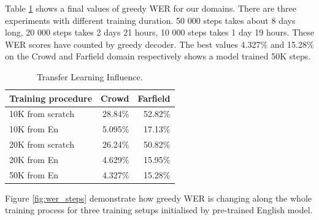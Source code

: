 \documentclass[a4paper]{article}
\begin{document}
Table \ref{tab:wer_50k} shows a final values of greedy WER for our domains. There are three experiments with different training duration. 50 000 steps takes about 8 days long, 20 000 steps takes 2 days 21 hours, 10 000 steps takes 1 day 19 hours. These WER scores have counted by greedy decoder. The best values 4.327\% and 15.28\% on the Crowd and Farfield domain respectively shows a model trained 50K steps. 

\begin{table}[t]
  \caption{Transfer Learning Influence.}
  \label{tab:wer_50k}
  \centering
  \begin{tabular}{lrr}
    \toprule
    \textbf{Training procedure } & \textbf{Crowd} & \textbf{Farfield} \\
    \midrule
    10K from scratch   &  28.84\%   & 52.82\% \\
    10K from En    & 5.095\%       & 17.13\%  \\
    \midrule
    20K from scratch   &  26.24\%   & 50.82\% \\
    20K from En    & 4.629\%       & 15.95\% \\
    \midrule
    50K from En    & 4.327\%       & 15.28\% \\
    \bottomrule
  \end{tabular}
\end{table}


Figure \ref{fig:wer_steps} demonstrate how greedy WER is changing along the whole training process for three training setups initialised by pre-trained English model. 
\end{document}
